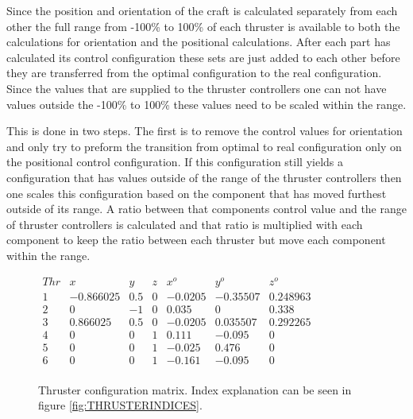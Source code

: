 Since the position and orientation of the craft is calculated separately from each other the full range from -100\% to 100\% of each thruster is available to both the calculations for orientation and the positional calculations. After each part has calculated its control configuration these sets are just added to each other before they are transferred from the optimal configuration to the real configuration. Since the values that are supplied to the thruster controllers one can not have values outside the -100\% to 100\% these values need to be scaled within the range. 

This is done in two steps. The first is to remove the control values for orientation and only try to preform the transition from optimal to real configuration only on the positional control configuration. If this configuration still yields a configuration that has values outside of the range of the thruster controllers then one scales this configuration based on the component that has moved furthest outside of its range. A ratio between that components control value and the range of thruster controllers is calculated and that ratio is multiplied with each component to keep the ratio between each thruster but move each component within the range. 

\begin{figure}
	\begin{center}
		\begin{math}
			\begin{matrix}
				Thr & x & y & z & x^o & y^o & z^o\\
				1 & -0.866025 & 0.5 & 0 & -0.0205 & -0.35507 & 0.248963 \\
				2 & 0 & -1 & 0 & 0.035 & 0 & 0.338 \\
				3 & 0.866025 & 0.5 & 0 & -0.0205 & 0.035507 & 0.292265 \\
				4 & 0 & 0 & 1 & 0.111 & -0.095 & 0 \\
				5 & 0 & 0 & 1 & -0.025 & 0.476 & 0 \\
				6 & 0 & 0 & 1 & -0.161 & -0.095 & 0 \\
			\end{matrix}
		\end{math}
		\caption{Thruster configuration matrix. Index explanation can be seen  in figure \ref{fig:THRUSTERINDICES}.}
		\label{fig:THRUSTERCONFIGURATIONMATRIX}
	\end{center}
\end{figure}



